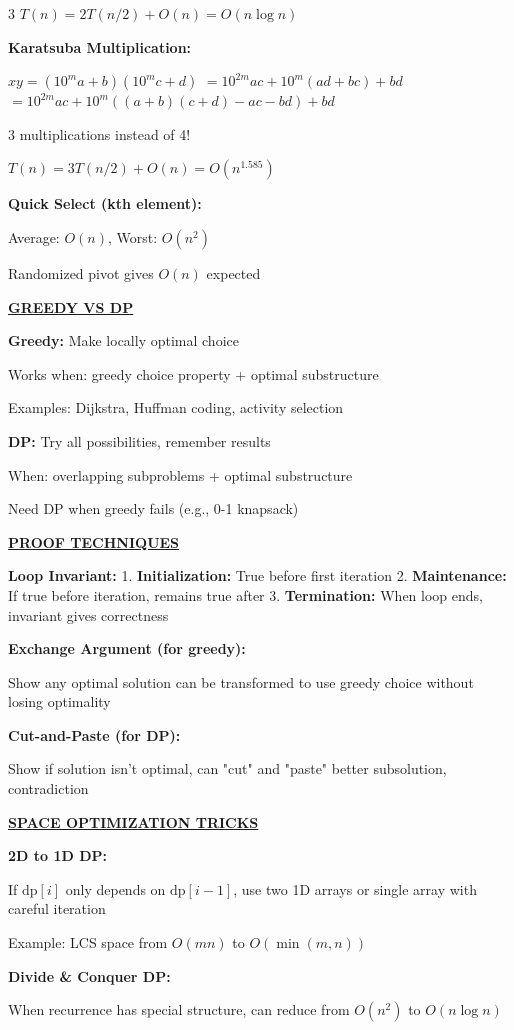 \documentclass[7pt,landscape]{article}
\newcommand{\sect}[1]{\vspace{1mm}\textbf{\underline{#1}}\vspace{0.5mm}}
\begin{document}
\begin{multicols}{3}
$T(n) = 2T(n/2) + O(n) = O(n\log n)$

\textbf{Karatsuba Multiplication:}

$xy = (10^m a + b)(10^m c + d)$
$= 10^{2m}ac + 10^m(ad+bc) + bd$
$= 10^{2m}ac + 10^m((a+b)(c+d)-ac-bd) + bd$

3 multiplications instead of 4!

$T(n) = 3T(n/2) + O(n) = O(n^{1.585})$

\textbf{Quick Select (kth element):}

Average: $O(n)$, Worst: $O(n^2)$

Randomized pivot gives $O(n)$ expected

\sect{GREEDY VS DP}

\textbf{Greedy:} Make locally optimal choice

Works when: greedy choice property + optimal substructure

Examples: Dijkstra, Huffman coding, activity selection

\textbf{DP:} Try all possibilities, remember results

When: overlapping subproblems + optimal substructure

Need DP when greedy fails (e.g., 0-1 knapsack)

\sect{PROOF TECHNIQUES}

\textbf{Loop Invariant:}
1. \textbf{Initialization:} True before first iteration
2. \textbf{Maintenance:} If true before iteration, remains true after
3. \textbf{Termination:} When loop ends, invariant gives correctness

\textbf{Exchange Argument (for greedy):}

Show any optimal solution can be transformed to use greedy choice without losing optimality

\textbf{Cut-and-Paste (for DP):}

Show if solution isn't optimal, can "cut" and "paste" better subsolution, contradiction

\sect{SPACE OPTIMIZATION TRICKS}

\textbf{2D to 1D DP:}

If $\text{dp}[i]$ only depends on $\text{dp}[i-1]$, use two 1D arrays or single array with careful iteration

Example: LCS space from $O(mn)$ to $O(\min(m,n))$

\textbf{Divide \& Conquer DP:}

When recurrence has special structure, can reduce from $O(n^2)$ to $O(n\log n)$


\end{multicols}
\end{document}
